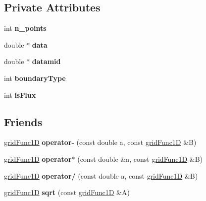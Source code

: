 \subsection*{Private Attributes}
\begin{DoxyCompactItemize}
\item 
\mbox{\label{classgridFunc1D_a4ababbcbdca2a233cb673fc8b1997ad1}} 
int {\bfseries n\+\_\+points}
\item 
\mbox{\label{classgridFunc1D_a2d4e4f9d31f1ae7406354bfd4c5a9db5}} 
double $\ast$ {\bfseries data}
\item 
\mbox{\label{classgridFunc1D_a4bd8aa8cca871f1183ae3f2cb735f909}} 
double $\ast$ {\bfseries datamid}
\item 
\mbox{\label{classgridFunc1D_a7ca7772f4f7efcbd9e686bf292779433}} 
int {\bfseries boundary\+Type}
\item 
\mbox{\label{classgridFunc1D_a8b4a9154c3cfa2756353bf62f1440821}} 
int {\bfseries is\+Flux}
\end{DoxyCompactItemize}
\subsection*{Friends}
\begin{DoxyCompactItemize}
\item 
\mbox{\label{classgridFunc1D_a82f5077526c231d53777ffa8dc25babe}} 
\hyperlink{classgridFunc1D}{grid\+Func1D} {\bfseries operator-\/} (const double a, const \hyperlink{classgridFunc1D}{grid\+Func1D} \&B)
\item 
\mbox{\label{classgridFunc1D_aca721beab66aeb7beaca902c6de6297d}} 
\hyperlink{classgridFunc1D}{grid\+Func1D} {\bfseries operator$\ast$} (const double \&a, const \hyperlink{classgridFunc1D}{grid\+Func1D} \&B)
\item 
\mbox{\label{classgridFunc1D_a14fa7624f830d55e478316b887fc1a22}} 
\hyperlink{classgridFunc1D}{grid\+Func1D} {\bfseries operator/} (const double a, const \hyperlink{classgridFunc1D}{grid\+Func1D} \&B)
\item 
\mbox{\label{classgridFunc1D_a3a2a38cf32f17dc89c19094b1ae9795a}} 
\hyperlink{classgridFunc1D}{grid\+Func1D} {\bfseries sqrt} (const \hyperlink{classgridFunc1D}{grid\+Func1D} \&A)
\end{DoxyCompactItemize}


